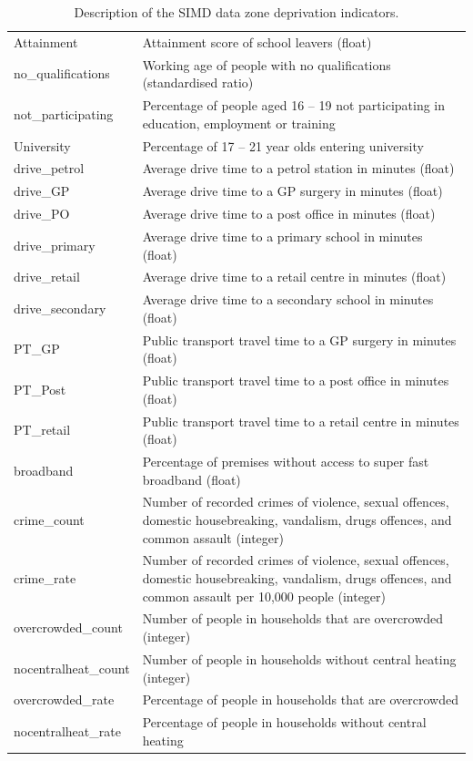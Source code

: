 \documentclass{thesis}
\begin{document}
\begin{table}[ht!]
\begin{tabular}{||l p{100mm}||}
     Attainment & Attainment score of school leavers (float) \\
     no\_qualifications & Working age of people with no qualifications (standardised ratio) \\
     not\_participating & Percentage of people aged 16 -- 19 not participating in education, employment or training \\
     University & Percentage of 17 -- 21 year olds entering university \\
     drive\_petrol & Average drive time to a petrol station in minutes (float) \\
     drive\_GP & Average drive time to a GP surgery in minutes (float) \\
     drive\_PO & Average drive time to a post office in minutes (float) \\
     drive\_primary & Average drive time to a primary school in minutes (float) \\
     drive\_retail & Average drive time to a retail centre in minutes (float) \\
     drive\_secondary & Average drive time to a secondary school in minutes (float) \\
     PT\_GP & Public transport travel time to a GP surgery in minutes (float) \\
     PT\_Post & Public transport travel time to a post office in minutes (float) \\
     PT\_retail & Public transport travel time to a retail centre in minutes (float) \\
     broadband & Percentage of premises without access to super fast broadband (float) \\
     crime\_count & Number of recorded crimes of violence, sexual offences, domestic housebreaking, vandalism, drugs offences, and common assault (integer) \\
     crime\_rate & Number of recorded crimes of violence, sexual offences, domestic housebreaking, vandalism, drugs offences, and common assault per 10,000 people (integer) \\
     overcrowded\_count & Number of people in households that are overcrowded (integer) \\
     nocentralheat\_count & Number of people in households without central heating (integer) \\
     overcrowded\_rate & Percentage of people in households that are overcrowded \\
     nocentralheat\_rate & Percentage of people in households without central heating \\ [1ex] 
     \hline
    \end{tabular}
    \hspace{100mm}
    \caption{Description of the SIMD data zone deprivation indicators.}
    \label{table:simd-deprivation-indicators}
\end{table}
\end{document}
